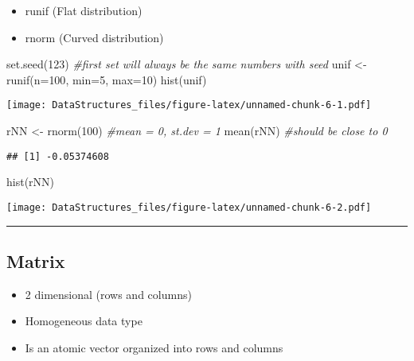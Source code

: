 \documentclass[
]{article}
\newenvironment{Shaded}{\begin{snugshade}}{\end{snugshade}}
\newcommand{\AttributeTok}[1]{\textcolor[rgb]{0.77,0.63,0.00}{#1}}
\newcommand{\CommentTok}[1]{\textcolor[rgb]{0.56,0.35,0.01}{\textit{#1}}}
\newcommand{\DecValTok}[1]{\textcolor[rgb]{0.00,0.00,0.81}{#1}}
\newcommand{\FunctionTok}[1]{\textcolor[rgb]{0.00,0.00,0.00}{#1}}
\newcommand{\NormalTok}[1]{#1}
\newcommand{\OtherTok}[1]{\textcolor[rgb]{0.56,0.35,0.01}{#1}}
\providecommand{\tightlist}{%
  \setlength{\itemsep}{0pt}\setlength{\parskip}{0pt}}
\begin{document}
\begin{itemize}
\tightlist
\item
  runif (Flat distribution)
\item
  rnorm (Curved distribution)
\end{itemize}

\begin{Shaded}
\begin{Highlighting}[]
\FunctionTok{set.seed}\NormalTok{(}\DecValTok{123}\NormalTok{) }\CommentTok{\#first set will always be the same numbers with seed}
\NormalTok{unif }\OtherTok{\textless{}{-}} \FunctionTok{runif}\NormalTok{(}\AttributeTok{n=}\DecValTok{100}\NormalTok{, }\AttributeTok{min=}\DecValTok{5}\NormalTok{, }\AttributeTok{max=}\DecValTok{10}\NormalTok{)}
\FunctionTok{hist}\NormalTok{(unif)}
\end{Highlighting}
\end{Shaded}

\texttt{[image: DataStructures\_files/figure-latex/unnamed-chunk-6-1.pdf]}

\begin{Shaded}
\begin{Highlighting}[]
\NormalTok{rNN }\OtherTok{\textless{}{-}} \FunctionTok{rnorm}\NormalTok{(}\DecValTok{100}\NormalTok{) }\CommentTok{\#mean = 0, st.dev = 1}
\FunctionTok{mean}\NormalTok{(rNN) }\CommentTok{\#should be close to 0}
\end{Highlighting}
\end{Shaded}

\begin{verbatim}
## [1] -0.05374608
\end{verbatim}

\begin{Shaded}
\begin{Highlighting}[]
\FunctionTok{hist}\NormalTok{(rNN)}
\end{Highlighting}
\end{Shaded}

\texttt{[image: DataStructures\_files/figure-latex/unnamed-chunk-6-2.pdf]}

\begin{center}\rule{0.5\linewidth}{0.5pt}\end{center}

\hypertarget{matrix}{%
\subsection{Matrix}\label{matrix}}

\begin{itemize}
\tightlist
\item
  2 dimensional (rows and columns)
\item
  Homogeneous data type
\item
  Is an atomic vector organized into rows and columns
\end{itemize}
\end{document}
